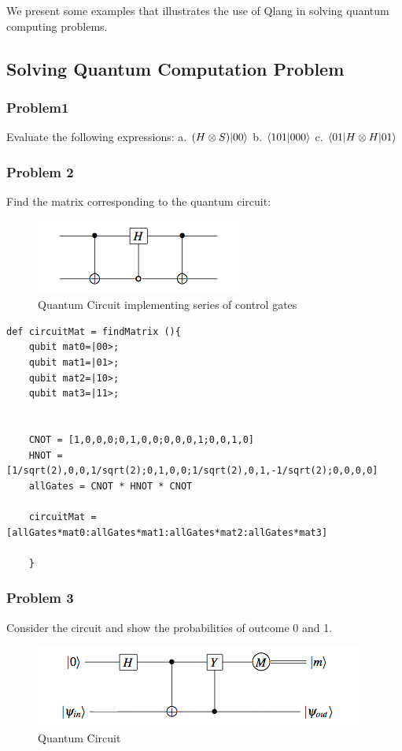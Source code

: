 We present some examples that illustrates the use of Qlang in solving quantum computing problems.

\subsection { Solving Quantum Computation Problem}
\subsubsection{Problem1}
Evaluate the following expressions: a. $(H \otimes S) |00\rangle$ b. $\dotproduct[101,000]$ c. $\langle 01| H \otimes H |01\rangle $
\subsubsection{Problem 2}
Find the matrix corresponding to the quantum circuit:
\begin{figure}[h!]
\begin{center}
\includegraphics{circuit1}
\end{center}
\caption{ Quantum Circuit implementing series of control gates
\label{cir1}}
\end{figure}

\begin{lstlisting}
def circuitMat = findMatrix (){
	qubit mat0=|00>;
	qubit mat1=|01>;
	qubit mat2=|10>;
	qubit mat3=|11>;
		
		
	CNOT = [1,0,0,0;0,1,0,0;0,0,0,1;0,0,1,0]
	HNOT = [1/sqrt(2),0,0,1/sqrt(2);0,1,0,0;1/sqrt(2),0,1,-1/sqrt(2);0,0,0,0]
	allGates = CNOT * HNOT * CNOT
		
	circuitMat =[allGates*mat0:allGates*mat1:allGates*mat2:allGates*mat3]
		
	}
\end{lstlisting}
\subsubsection{Problem 3}
Consider the circuit and show the probabilities of outcome 0 and 1.
\begin{figure}[h!]
\begin{center}
\includegraphics{circuit2}
\end{center}
\caption{ Quantum Circuit 
\label{cir1}}
\end{figure}

